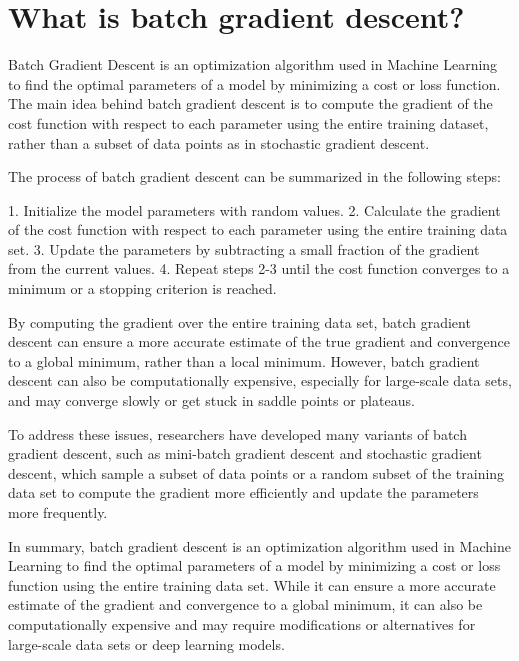 \section{What is batch gradient descent?}
Batch Gradient Descent is an optimization algorithm used in Machine Learning to find the optimal parameters of a model by minimizing a cost or loss function. The main idea behind batch gradient descent is to compute the gradient of the cost function with respect to each parameter using the entire training dataset, rather than a subset of data points as in stochastic gradient descent.

The process of batch gradient descent can be summarized in the following steps:

1. Initialize the model parameters with random values.
2. Calculate the gradient of the cost function with respect to each parameter using the entire training data set.
3. Update the parameters by subtracting a small fraction of the gradient from the current values.
4. Repeat steps 2-3 until the cost function converges to a minimum or a stopping criterion is reached.

By computing the gradient over the entire training data set, batch gradient descent can ensure a more accurate estimate of the true gradient and convergence to a global minimum, rather than a local minimum. However, batch gradient descent can also be computationally expensive, especially for large-scale data sets, and may converge slowly or get stuck in saddle points or plateaus.

To address these issues, researchers have developed many variants of batch gradient descent, such as mini-batch gradient descent and stochastic gradient descent, which sample a subset of data points or a random subset of the training data set to compute the gradient more efficiently and update the parameters more frequently.

In summary, batch gradient descent is an optimization algorithm used in Machine Learning to find the optimal parameters of a model by minimizing a cost or loss function using the entire training data set. While it can ensure a more accurate estimate of the gradient and convergence to a global minimum, it can also be computationally expensive and may require modifications or alternatives for large-scale data sets or deep learning models.

